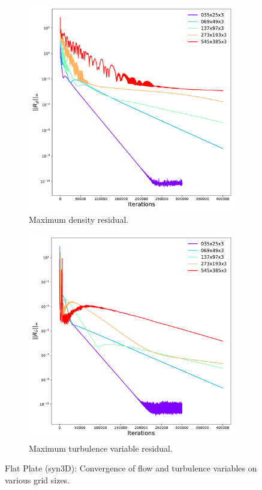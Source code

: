 \begin{figure}[ht!]
\centering
\begin{subfigure}{.45\textwidth}
  \centering
  \includegraphics[width=1.0\textwidth]{figs/flat/gov_convergence_gridstudy.pdf}
  \caption{Maximum density residual.}
\end{subfigure}%
\begin{subfigure}{.45\textwidth}
    \centering
    \includegraphics[width=1.0\textwidth]{figs/flat/SA_convergence_gridstudy.pdf}
    \caption{Maximum turbulence variable residual.}
\end{subfigure}
\caption{Flat Plate (syn3D): Convergence of flow and turbulence variables on various grid sizes.}
\label{fig:synflatcnvstudy}
\end{figure}

